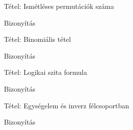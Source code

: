 \documentclass{beamer}
\begin{document}
\begin{frame}

\begin{block}{Tétel: Ismétléses permutációk száma}
\end{block}

\begin{block}{Bizonyítás}
\end{block}

\end{frame}

\begin{frame}

\begin{block}{Tétel: Binomiális tétel}
\end{block}

\begin{block}{Bizonyítás}
\end{block}

\end{frame}

\begin{frame}

\begin{block}{Tétel: Logikai szita formula}
\end{block}

\begin{block}{Bizonyítás}
\end{block}

\end{frame}








\begin{frame}

\begin{block}{Tétel: Egységelem és inverz félcsoportban}
\end{block}

\begin{block}{Bizonyítás}
\end{block}

\end{frame}
\end{document}
